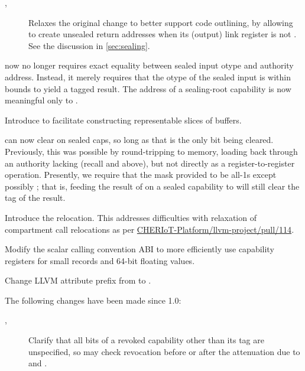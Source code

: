 \begin{description}
\begin{description}
      \begin{description}
        \item[, ] Relaxes the original change to better support code outlining,
          by allowing  to create unsealed return addresses
          when its (output) link register is not .
          See the discussion in \cref{sec:sealing}.
      \end{description}
    \item[\ghissue{71}, \ghpr{87}]  now no longer requires exact equality between sealed input otype and authority address.
      Instead, it merely requires that the otype of the sealed input is within bounds to yield a tagged result.
      The address of a sealing-root capability is now meaningful only to .
    \item[\ghissue{72},\ghpr{74}] Introduce  to facilitate constructing representable slices of buffers.
    \item[\ghissue{70},\ghpr{83}]  can now clear \cappermG on sealed caps, so long as that is the only bit being cleared.
      Previously, this was possible by round-tripping to memory, loading back through an authority lacking \cappermILG(recall  and  above), but not directly as a register-to-register operation.
      Presently, we require that the mask provided to  be all-1s except possibly \cappermG;
      that is, feeding the result of  on a sealed capability to  will still clear the tag of the result.
    \item[\ghpr{97}] Introduce the  relocation. This addresses difficulties with relaxation of compartment call relocations as per 
    \href{https://github.com/CHERIoT-Platform/llvm-project/pull/114}{CHERIoT-Platform/llvm-project/pull/114}.
    \item[\ghpr{104}, \ghpr{105}] Modify the scalar calling convention ABI to more efficiently use capability registers for small records and 64-bit floating values.
    \item[\ghpr{112}] Change LLVM attribute prefix from  to .
  \end{description}
\item[Unreleased] The following changes have been made since 1.0:
  \begin{description}
    \item[, ] Clarify that all bits of a revoked capability other than its tag are unspecified, so  may check revocation before or after the attenuation due to \cappermILG and \cappermLM.
  \end{description}
\end{description}
